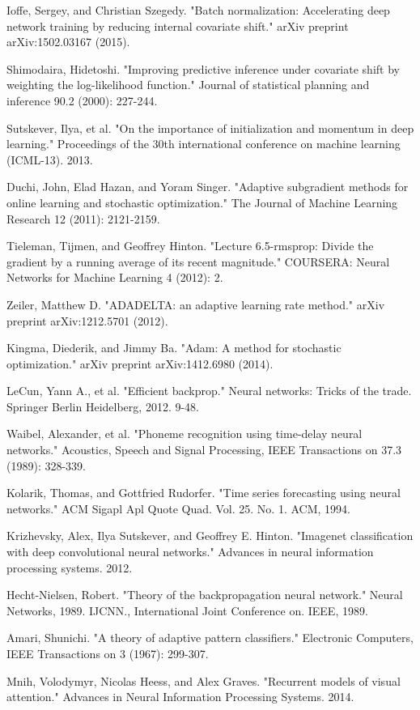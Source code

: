 \documentclass[12pt]{article}
\begin{document}
\newpage
{}
\begin{thebibliography}{99}


Ioffe, Sergey, and Christian Szegedy. "Batch normalization: Accelerating deep network training by reducing internal covariate shift." arXiv preprint arXiv:1502.03167 (2015).

Shimodaira, Hidetoshi. "Improving predictive inference under covariate shift by weighting the log-likelihood function." Journal of statistical planning and inference 90.2 (2000): 227-244.

Sutskever, Ilya, et al. "On the importance of initialization and momentum in deep learning." Proceedings of the 30th international conference on machine learning (ICML-13). 2013.

Duchi, John, Elad Hazan, and Yoram Singer. "Adaptive subgradient methods for online learning and stochastic optimization." The Journal of Machine Learning Research 12 (2011): 2121-2159.

Tieleman, Tijmen, and Geoffrey Hinton. "Lecture 6.5-rmsprop: Divide the gradient by a running average of its recent magnitude." COURSERA: Neural Networks for Machine Learning 4 (2012): 2.

Zeiler, Matthew D. "ADADELTA: an adaptive learning rate method." arXiv preprint arXiv:1212.5701 (2012).

Kingma, Diederik, and Jimmy Ba. "Adam: A method for stochastic optimization." arXiv preprint arXiv:1412.6980 (2014).

LeCun, Yann A., et al. "Efficient backprop." Neural networks: Tricks of the trade. Springer Berlin Heidelberg, 2012. 9-48.

Waibel, Alexander, et al. "Phoneme recognition using time-delay neural networks." Acoustics, Speech and Signal Processing, IEEE Transactions on 37.3 (1989): 328-339.

Kolarik, Thomas, and Gottfried Rudorfer. "Time series forecasting using neural networks." ACM Sigapl Apl Quote Quad. Vol. 25. No. 1. ACM, 1994.

Krizhevsky, Alex, Ilya Sutskever, and Geoffrey E. Hinton. "Imagenet classification with deep convolutional neural networks." Advances in neural information processing systems. 2012.

Hecht-Nielsen, Robert. "Theory of the backpropagation neural network." Neural Networks, 1989. IJCNN., International Joint Conference on. IEEE, 1989.

Amari, Shunichi. "A theory of adaptive pattern classifiers." Electronic Computers, IEEE Transactions on 3 (1967): 299-307.

Mnih, Volodymyr, Nicolas Heess, and Alex Graves. "Recurrent models of visual attention." Advances in Neural Information Processing Systems. 2014.

\end{thebibliography}
\end{document}
